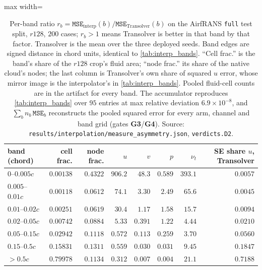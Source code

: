 \begin{table}[t]
\centering
\small
\caption{Per-band ratio $r_b = \texttt{MSE}_{\text{interp}}(b) / \texttt{MSE}_{
\text{Transolver}}(b)$ on the AirfRANS \texttt{full} test split, $r128$, $200$ cases;
$r_b>1$ means Transolver is better in that band by that factor. Transolver is the mean
over the three deployed seeds. Band edges are signed distance in chord units, identical to
\autoref{tab:interp_bands}. ``Cell frac.'' is the band's share of the $r128$ crop's fluid
area; ``node frac.'' its share of the native cloud's nodes; the last column is
Transolver's own share of squared $u$ error, whose mirror image is the interpolator's in
\autoref{tab:interp_bands}. Pooled fluid-cell counts are in the artifact for every band.
The accumulator
reproduces \autoref{tab:interp_bands} over $95$ entries at max relative deviation
$6.9{\times}10^{-8}$, and $\sum_b n_b\,\texttt{MSE}_b$ reconstructs the pooled squared
error for every arm, channel and band grid (gates \textbf{G3}/\textbf{G4}). Source:
\texttt{results\slash{}interpolation\slash{}measure\_asymmetry.json}, \texttt{verdicts.D2}.}
\label{tab:bandratio}
\begin{adjustbox}{max width=\textwidth}
\begin{tabular}{l r r r r r r r}
\toprule
band (chord) & cell frac. & node frac. & $u$ & $v$ & $p$ & $\nu_t$ & SE share $u$, Transolver \\
\midrule
$0$--$0.005c$ & $0.00138$ & $0.4322$ & $\mathbf{906.2}$ & $48.3$ & $0.589$ & $393.1$ & $0.0057$ \\
$0.005$--$0.01c$ & $0.00118$ & $0.0612$ & $74.1$ & $3.30$ & $2.49$ & $65.6$ & $0.0045$ \\
$0.01$--$0.02c$ & $0.00251$ & $0.0619$ & $30.4$ & $1.17$ & $1.58$ & $15.7$ & $0.0094$ \\
$0.02$--$0.05c$ & $0.00742$ & $0.0884$ & $5.33$ & $0.391$ & $1.22$ & $4.44$ & $0.0210$ \\
$0.05$--$0.15c$ & $0.02942$ & $0.1118$ & $0.572$ & $0.113$ & $0.259$ & $3.70$ & $0.0560$ \\
$0.15$--$0.5c$ & $0.15831$ & $0.1311$ & $0.559$ & $0.030$ & $0.031$ & $9.45$ & $0.1847$ \\
$>0.5c$ & $0.79978$ & $0.1134$ & $\mathbf{0.312}$ & $0.007$ & $0.004$ & $21.1$ & $\mathbf{0.7188}$ \\
\bottomrule
\end{tabular}
\end{adjustbox}
\end{table}

